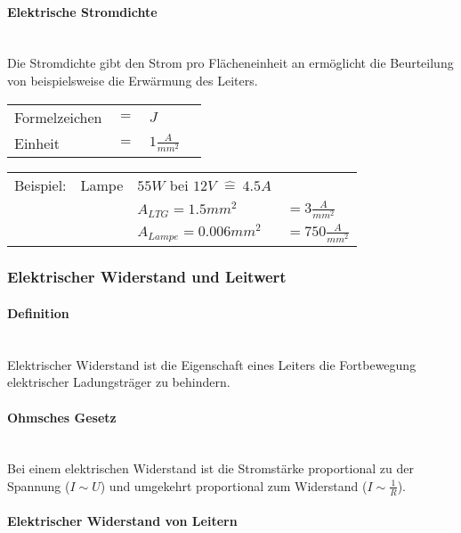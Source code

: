 		\paragraph{Elektrische Stromdichte}~\\
		
\noindent Die Stromdichte gibt den Strom pro Flächeneinheit an ermöglicht die Beurteilung von beispielsweise die Erwärmung des Leiters.	

\begin{tabular}{llll}
Formelzeichen	& $=$ & $J$ &\\
Einheit			& $=$ & $1\frac{A}{mm^2}$ &\\
\end{tabular}\newline

\begin{tabular}{llll}
Beispiel: & Lampe & $55W$ bei $12V$ $\widehat{=}\ 4.5A$ &\\
& & $A_{LTG} = 1.5mm^2$ & $= 3\frac{A}{mm^2}$\\
& & $A_{Lampe} = 0.006mm^2$ & $= 750\frac{A}{mm^2}$\\
\end{tabular}
		
	\subsubsection{Elektrischer Widerstand und Leitwert}
		\paragraph{Definition}~\\

\noindent Elektrischer Widerstand ist die Eigenschaft eines Leiters die Fortbewegung elektrischer Ladungsträger zu behindern.

		\paragraph{Ohmsches Gesetz}~\\
		
\noindent Bei einem elektrischen Widerstand ist die Stromstärke proportional zu der Spannung ($I \sim U$) und umgekehrt proportional zum Widerstand ($I \sim \frac{1}{R}$).

		\paragraph{Elektrischer Widerstand von Leitern}~\\
		
